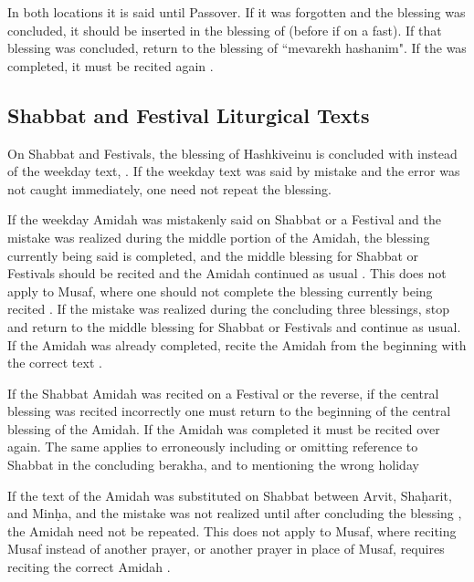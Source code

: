 In both locations it is said until Passover. If it was forgotten and the blessing was concluded, it should be inserted in the blessing of  (before  if on a fast). If that blessing was concluded, return to the blessing of ``mevarekh hashanim".  If the \amidah was completed, it must be recited again \parencite*{PH}.

\subsection{Shabbat and Festival Liturgical Texts}

On Shabbat and Festivals, the blessing of Hashkiveinu is concluded with  instead of the weekday text, .  If the weekday text was said by mistake and the error was not caught immediately, one need not repeat the blessing.

If the weekday Amidah was mistakenly said on Shabbat or a Festival and the mistake was realized during the middle portion of the Amidah, the blessing currently being said is completed, and the middle blessing for Shabbat or Festivals should be recited and the Amidah continued as usual \parencite*[76:16]{Kitzur}.  This does not apply to Musaf, where one should not complete the blessing currently being recited \parencite*[76:19]{Kitzur}.  If the mistake was realized during the concluding three blessings, stop and return to the middle blessing for Shabbat or Festivals and continue as usual. If the Amidah was already completed, recite the Amidah from the beginning with the correct text \parencite*[76:18]{Kitzur}.

If the Shabbat Amidah was recited on a Festival or the reverse, if the central blessing was recited incorrectly one must return to the beginning of the central blessing of the Amidah.  If the Amidah was completed it must be recited over again.  The same applies to erroneously including or omitting reference to Shabbat in the concluding berakha, and to mentioning the wrong holiday \parencite*[2:3:4]{PHYT}

If the text of the Amidah was substituted on Shabbat between Arvit, Sha\d{h}arit, and Min\d{h}a, and the mistake was not realized until after concluding the blessing , the Amidah need not be repeated.  This does not apply to Musaf, where reciting Musaf instead of another prayer, or another prayer in place of Musaf, requires reciting the correct Amidah \parencite*[76:21-22]{Kitzur}.

